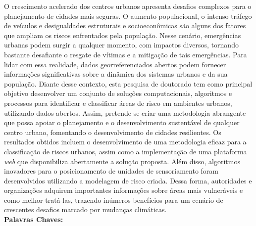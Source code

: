 \begin{thesisresumo}

O crescimento acelerado dos centros urbanos apresenta desafios complexos para o planejamento de cidades mais seguras. O aumento populacional, o intenso tráfego de veículos e desigualdades estruturais e socioeconômicas são alguns dos fatores que ampliam os riscos enfrentados pela população. Nesse cenário, emergências urbanas podem surgir a qualquer momento, com impactos diversos, tornando bastante desafiante o resgate de vítimas e a mitigação de tais emergências. Para lidar com essa realidade, dados georreferenciados abertos podem fornecer informações significativas sobre a dinâmica dos sistemas urbanos e da sua população. Diante desse contexto, esta pesquisa de doutorado tem como principal objetivo desenvolver um conjunto de soluções computacionais, algoritmos e processos para identificar e classificar áreas de risco em ambientes urbanos, utilizando dados abertos. Assim, pretende-se criar uma metodologia abrangente que possa apoiar o planejamento e o desenvolvimento sustentável de qualquer centro urbano, fomentando o desenvolvimento de cidades resilientes. Os resultados obtidos incluem o desenvolvimento de uma metodologia eficaz para a classificação de riscos urbanos, assim como a implementação de uma plataforma \textit{web} que disponibiliza abertamente a solução proposta. Além disso, algoritmos inovadores para o posicionamento de unidades de sensoriamento foram desenvolvidos utilizando a modelagem de risco criada. Dessa forma, autoridades e organizações adquirem importantes informações sobre áreas mais vulneráveis e como melhor tratá-las, trazendo inúmeros benefícios para um cenário de crescentes desafios marcado por mudanças climáticas.\\

\textbf{Palavras Chaves:} \ppgmpalavraschave

\end{thesisresumo}

